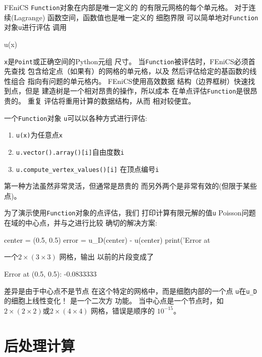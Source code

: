 
FEniCS \texttt{Function}对象在内部是唯一定义的
的有限元网格的每个单元格。 对于连续(Lagrange)
函数空间，函数值也是唯一定义的
细胞界限 可以简单地对\texttt{Function}对象\texttt{u}进行评估
调用

\begin{python}
u(x)
\end{python}
\texttt{x}是\texttt{Point}或正确空间的Python元组
尺寸。 当\texttt{Function}被评估时，FEniCS必须首先查找
包含给定点（如果有）的网格的单元格，以及
然后评估给定的基函数的线性组合
指向有问题的单元格内。 FEniCS使用高效数据
结构（边界框树）快速找到点，但是
建造树是一个相对昂贵的操作，所以成本
在单点评估\texttt{Function}是很昂贵的。 重复
评估将重用计算的数据结构，从而
相对较便宜。

\begin{notice}[廉价vs昂贵的功能评估]
一个\texttt{Function}对象
\texttt{u}可以以各种方式进行评估:

\begin{enumerate}
\item \texttt{u(x)}为任意点\texttt{x}

\item \texttt{u.vector().array()[i]}自由度数\texttt{i}

\item \verb!u.compute_vertex_values()[i]! 在顶点编号\texttt{i}
\end{enumerate}

\noindent
第一种方法虽然非常灵活，但通常是昂贵的
而另外两个是非常有效的(但限于某些点)。
\end{notice} 

为了演示使用\texttt{Function}对象的点评估，我们
打印计算有限元解的值\texttt{u}
Poisson问题在域的中心点，并与之进行比较
确切的解决方案:

\begin{python}
center = (0.5, 0.5)
error = u_D(center) - u(center)
print('Error at %
\end{python}
一个$2\times(3\times 3)$
网格，输出
以前的片段变成了

\begin{python}
Error at (0.5, 0.5): -0.0833333
\end{python}
差异是由于中心点不是节点
在这个特定的网格中，而是细胞内部的一个点
\texttt{u}在\verb!u_D!的细胞上线性变化！ 是一个二次方
功能。 当中心点是一个节点时，如$2\times(2\times
2)$或$2\times(4\times 4)$
网格，错误是顺序的
$10 ^{ - 15}$。

\section{后处理计算}
\label{ftut:possion:2D:varcoeff}

